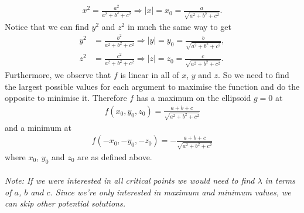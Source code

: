 \documentclass{article}
\begin{document}
\begin{align*}
  x^2=\frac{a^2}{a^2+b^2+c^2} \Rightarrow |x|=x_0=\frac{a}{\sqrt{a^2+b^2+c^2}}.
\end{align*}
Notice that we can find $y^2$ and $z^2$ in much the same way to get
\begin{align*}
  y^2&=\frac{b^2}{a^2+b^2+c^2}\Rightarrow |y|=y_0=\frac{b}{\sqrt{a^2+b^2+c^2}},\\
  z^2&=\frac{c^2}{a^2+b^2+c^2}\Rightarrow |z|=z_0=\frac{c}{\sqrt{a^2+b^2+c^2}}.
\end{align*}
Furthermore, we observe that $f$ is linear in all of $x$, $y$ and $z$.
So we need to find the largest possible values for each argument to maximise
the function and do the opposite to minimise it. Therefore $f$ has a maximum
on the ellipsoid $g=0$ at
\begin{align*}
  f(x_0,y_0,z_0) = \frac{a+b+c}{\sqrt{a^2+b^2+c^2}}
\end{align*}
and a minimum at
\begin{align*}
  f(-x_0, -y_0, -z_0) = -\frac{a+b+c}{\sqrt{a^2+b^2+c^2}}
\end{align*}
where $x_0$, $y_0$ and $z_0$ are as defined above.\\\\
\emph{Note: If we were interested in all critical points we would need to find
$\lambda$ in terms of $a$, $b$ and $c$. Since we're only interested in maximum
and minimum values, we can skip other potential solutions.}
\end{document}
